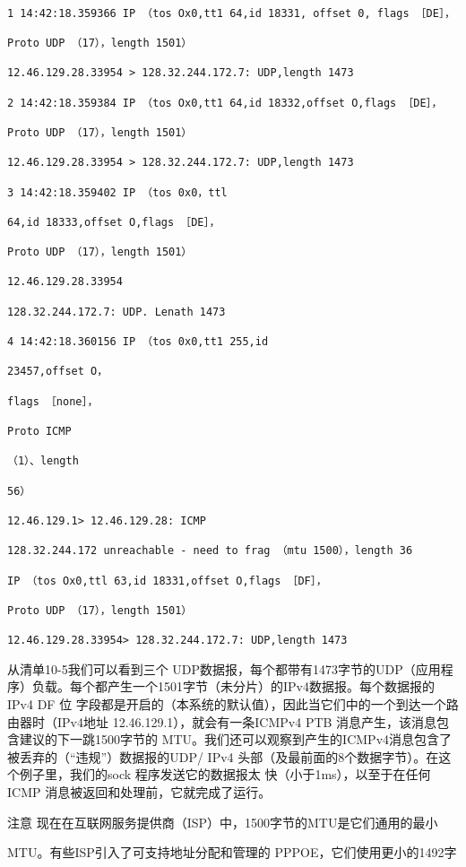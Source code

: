 \begin{verbatim}
    
1 14:42:18.359366 IP （tos Ox0,tt1 64,id 18331, offset 0, flags ［DE］，

Proto UDP （17），length 1501）

12.46.129.28.33954 > 128.32.244.172.7: UDP,length 1473

2 14:42:18.359384 IP （tos Ox0,tt1 64,id 18332,offset O,flags ［DE］，

Proto UDP （17），length 1501）

12.46.129.28.33954 > 128.32.244.172.7: UDP,length 1473

3 14:42:18.359402 IP （tos 0x0，ttl

64,id 18333,offset O,flags ［DE］，

Proto UDP （17），length 1501）

12.46.129.28.33954

128.32.244.172.7: UDP. Lenath 1473

4 14:42:18.360156 IP （tos 0x0,tt1 255,id

23457,offset O，

flags ［none］，

Proto ICMP

（1）、length

56）

12.46.129.1> 12.46.129.28: ICMP

128.32.244.172 unreachable - need to frag （mtu 1500），length 36

IP （tos Ox0,ttl 63,id 18331,offset O,flags ［DF］，

Proto UDP （17），length 1501）

12.46.129.28.33954> 128.32.244.172.7: UDP,length 1473
\end{verbatim}

从清单10-5我们可以看到三个 UDP数据报，每个都带有1473字节的UDP（应用程
序）负载。每个都产生一个1501字节（未分片）的IPv4数据报。每个数据报的IPv4 DF 位
字段都是开启的（本系统的默认值），因此当它们中的一个到达一个路由器时（IPv4地址
12.46.129.1），就会有一条ICMPv4 PTB 消息产生，该消息包含建议的下一跳1500字节的
MTU。我们还可以观察到产生的ICMPv4消息包含了被丢弃的（“违规”）数据报的UDP/
IPv4 头部（及最前面的8个数据字节）。在这个例子里，我们的sock 程序发送它的数据报太
快（小于1ms），以至于在任何ICMP 消息被返回和处理前，它就完成了运行。

注意 现在在互联网服务提供商（ISP）中，1500字节的MTU是它们通用的最小

MTU。有些ISP引入了可支持地址分配和管理的 PPPOE，它们使用更小的1492字

